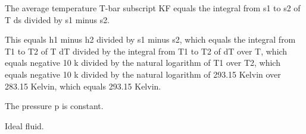 The average temperature T-bar subscript KF equals the integral from s1 to s2 of T ds divided by s1 minus s2.

This equals h1 minus h2 divided by s1 minus s2, which equals the integral from T1 to T2 of T dT divided by the integral from T1 to T2 of dT over T, which equals negative 10 k divided by the natural logarithm of T1 over T2, which equals negative 10 k divided by the natural logarithm of 293.15 Kelvin over 283.15 Kelvin, which equals 293.15 Kelvin.

The pressure p is constant.

Ideal fluid.